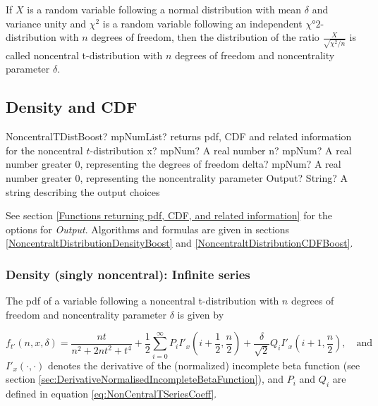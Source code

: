 If $X$ is a random variable following a normal distribution with mean $\delta$ and variance unity and $\chi^2$ is a random variable following an independent $\chi°2$-distribution with $n$ degrees of freedom, 
then the distribution of the ratio $\frac{X}{\sqrt{\chi^2 / n}}$ is called noncentral t-distribution with $n$ degrees of freedom and noncentrality parameter $\delta$.



\subsection{Density and CDF}

\begin{mpFunctionsExtract}
	\mpFunctionFour
	{NoncentralTDistBoost? mpNumList? returns pdf, CDF and related information for the noncentral $t$-distribution}
	{x? mpNum? A real number}
	{n? mpNum? A real number greater 0, representing the degrees of freedom}
	{delta? mpNum? A real number greater 0, representing the noncentrality parameter}
	{Output? String? A string describing the output choices}
\end{mpFunctionsExtract}


\vspace{0.3cm}
See section \ref{Functions returning pdf, CDF, and related information} for the options for {\itshape\sffamily Output}. Algorithms and formulas are given in sections \ref{NoncentraltDistributionDensityBoost} and \ref{NoncentraltDistributionCDFBoost}.



\label{NoncentraltDistributionDensityBoost}



\subsubsection{Density (singly noncentral): Infinite series}
The pdf of a variable following a noncentral  t-distribution with $n$ degrees of freedom and noncentrality parameter $\delta$ is given by \citep{boost_math}

\begin{equation}
	f_{t'}\left(n,x, \delta\right) = \frac{nt}{n^2+2nt^2+t^4} + \frac{1}{2} \sum_{i=0}^{\infty} P_i I'_x\left(i+ \frac{1}{2} , \frac{n}{2}\right) + \frac{\delta}{\sqrt{2}} Q_i I'_x\left(i+1, \frac{n}{2}\right), \quad \text{and}
\end{equation} 
$I'_x(\cdot,\cdot)$ denotes the derivative of the (normalized) incomplete beta function (see section \ref{sec:DerivativeNormalisedIncompleteBetaFunction}), and $P_i$ and $Q_i$ are defined in equation \ref{eq:NonCentralTSeriesCoeff}.



